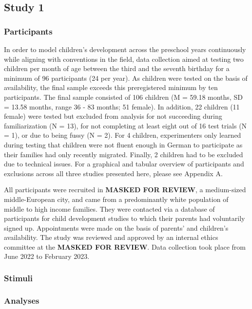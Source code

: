 \documentclass[
  man]{apa6}
\begin{document}
\subsection{Study 1}\label{study-1}

\subsubsection{Participants}\label{participants}

In order to model children's development across the preschool years continuously while aligning with conventions in the field, data collection aimed at testing two children per month of age between the third and the seventh birthday for a minimum of 96 participants (24 per year). As children were tested on the basis of availability, the final sample exceeds this preregistered minimum by ten participants. The final sample consisted of 106 children (M = 59.18 months, SD = 13.58 months, range 36 - 83 months; 51 female). In addition, 22 children (11 female) were tested but excluded from analysis for not succeeding during familiarization (N = 13), for not completing at least eight out of 16 test trials (N = 1), or due to being fussy (N = 2). For 4 children, experimenters only learned during testing that children were not fluent enough in German to participate as their families had only recently migrated. Finally, 2 children had to be excluded due to technical issues. For a graphical and tabular overview of participants and exclusions across all three studies presented here, please see Appendix A.

All participants were recruited in \textbf{MASKED FOR REVIEW}, a medium-sized middle-European city, and came from a predominantly white population of middle to high income families. They were contacted via a database of participants for child development studies to which their parents had voluntarily signed up. Appointments were made on the basis of parents' and children's availability. The study was reviewed and approved by an internal ethics committee at the \textbf{MASKED FOR REVIEW}. Data collection took place from June 2022 to February 2023.

\subsubsection{Stimuli}\label{stimuli-1}

\subsubsection{Analyses}\label{analyses}
\end{document}
